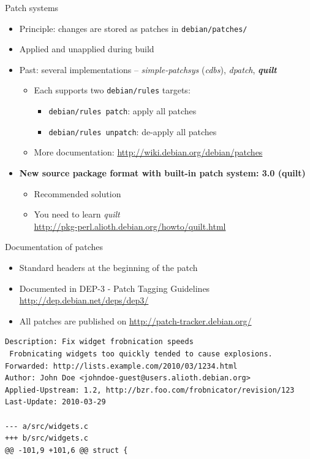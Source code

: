 \documentclass[10pt,final]{beamer}
\begin{document}
\begin{frame}{Patch systems}
  \begin{itemize}
  \item Principle: changes are stored as patches in \texttt{debian/patches/}
    \br
  \item Applied and unapplied during build
    \br
  \item Past: several implementations -- \textsl{simple-patchsys} (\textsl{cdbs}),
    \textsl{dpatch}, \textbf{\textsl{quilt}}
    \begin{itemize}
  \item Each supports two \texttt{debian/rules} targets:
    \begin{itemize}
    \item \texttt{debian/rules patch}: apply all patches
    \item \texttt{debian/rules unpatch}: de-apply all patches
    \end{itemize}
	  \hbr
  \item More documentation: \url{http://wiki.debian.org/debian/patches}
  \end{itemize}
  \br
  \item \textbf{New source package format with built-in patch system: 3.0 (quilt)}
  \begin{itemize}
  \item Recommended solution
	  \hbr
  \item You need to learn \textsl{quilt}\\
    \url{http://pkg-perl.alioth.debian.org/howto/quilt.html}
    
  \end{itemize}
  \end{itemize}
\end{frame}

\begin{frame}[fragile]{Documentation of patches}
  \begin{itemize}
	  \item Standard headers at the beginning of the patch
    \hbr
  \item Documented in DEP-3 - Patch Tagging Guidelines\\
    \url{http://dep.debian.net/deps/dep3/}
  \end{itemize}
\begin{itemize}
\item All patches are published on \url{http://patch-tracker.debian.org/}
\end{itemize}
\seprule
  \begin{lstlisting}[basicstyle=\ttfamily\footnotesize]
Description: Fix widget frobnication speeds
 Frobnicating widgets too quickly tended to cause explosions.
Forwarded: http://lists.example.com/2010/03/1234.html
Author: John Doe <johndoe-guest@users.alioth.debian.org>
Applied-Upstream: 1.2, http://bzr.foo.com/frobnicator/revision/123
Last-Update: 2010-03-29

--- a/src/widgets.c
+++ b/src/widgets.c
@@ -101,9 +101,6 @@ struct {
\end{lstlisting}
\end{frame}
\end{document}
